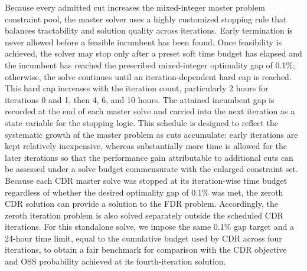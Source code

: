 \documentclass[opre,sglanonrev]{informs4}
\begin{document}
{\begin{APPENDICES}
Because every admitted cut increases the mixed-integer master problem constraint pool, the master solver uses a highly customized stopping rule that balances tractability and solution quality across iterations. Early termination is never allowed before a feasible incumbent has been found. Once feasibility is achieved, the solver may stop only after a preset soft time budget has elapsed and the incumbent has reached the prescribed mixed-integer optimality gap of 0.1\%; otherwise, the solve continues until an iteration-dependent hard cap is reached. This hard cap increases with the iteration count, particularly 2 hours for iterations 0 and 1, then 4, 6, and 10 hours. The attained incumbent gap is recorded at the end of each master solve and carried into the next iteration as a state variable for the stopping logic. This schedule is designed to reflect the systematic growth of the master problem as cuts accumulate: early iterations are kept relatively inexpensive, whereas substantially more time is allowed for the later iterations so that the performance gain attributable to additional cuts can be assessed under a solve budget commensurate with the enlarged constraint set. 
Because each CDR master solve was stopped at its iteration-wise time budget regardless of whether the desired optimality gap of 0.1\% was met, the zeroth CDR solution can provide a solution to the FDR problem. Accordingly, the zeroth iteration problem is also solved separately outside the scheduled CDR iterations. For this standalone solve, we impose the same 0.1\% gap target and a 24-hour time limit, equal to the cumulative budget used by CDR across four iterations, to obtain a fair benchmark for comparison with the CDR objective and OSS probability achieved at its fourth-iteration solution.




\end{APPENDICES}}
\end{document}
